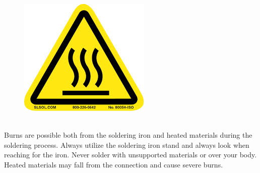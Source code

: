 \begin{framed}
\begin{figure}
\includegraphics[width=\linewidth]{images/burn_hazard.jpg}
\end{figure}
\ \\
Burns are possible both from the soldering iron and heated materials during the soldering process. Always utilize the soldering iron stand and always look when reaching for the iron. Never solder with unsupported materials or over your body. Heated materials may fall from the connection and cause severe burns.
\end{framed}

